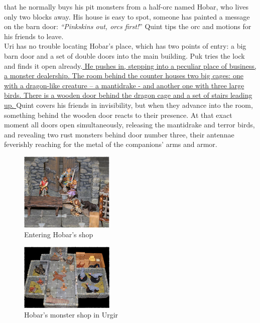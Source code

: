 that he normally buys his pit monsters from a half-orc named Hobar, who lives only two blocks away. His house is easy to spot, someone has painted a message on the barn door: {\itshape``Pinkskins out, orcs first!}'' Quint tips the orc and motions for his friends to leave.\\

Uri has no trouble locating Hobar's place, which has two points of entry: a big barn door and a set of double doors into the main building. Puk tries the lock and finds it open already.\hyperref[fig:Entering-Hobar-s-shop-591946639]{ He pushes in, stepping into a peculiar place of business, a monster dealership. }  \hyperref[fig:Hobar-s-monster-shop-in-Urgir-591945961]{ The room behind the counter houses two big cages: one with a dragon-like creature -- a mantidrake - and another one with three large birds. There is a wooden door behind the dragon cage and a set of stairs leading up. } Quint covers his friends in invisibility, but when they advance into the room, something behind the wooden door reacts to their presence. At that exact moment all doors open simultaneously, releasing the mantidrake and terror birds, and revealing two rust monsters behind door number three, their antennae feverishly reaching for the metal of the companions' arms and armor. \\

\begin{figure}[h]
	\centering
	\includegraphics[width=0.4\textwidth]{images/Entering-Hobar-s-shop-591946639_mod.jpg}
	\caption{Entering Hobar's shop}
	\label{fig:Entering-Hobar-s-shop-591946639}
\end{figure}

\begin{figure}[h]
	\centering
	\includegraphics[width=0.4\textwidth]{images/Hobar-s-monster-shop-in-Urgir-591945961_mod.jpg}
	\caption{Hobar's monster shop in Urgir}
	\label{fig:Hobar-s-monster-shop-in-Urgir-591945961}
\end{figure}

